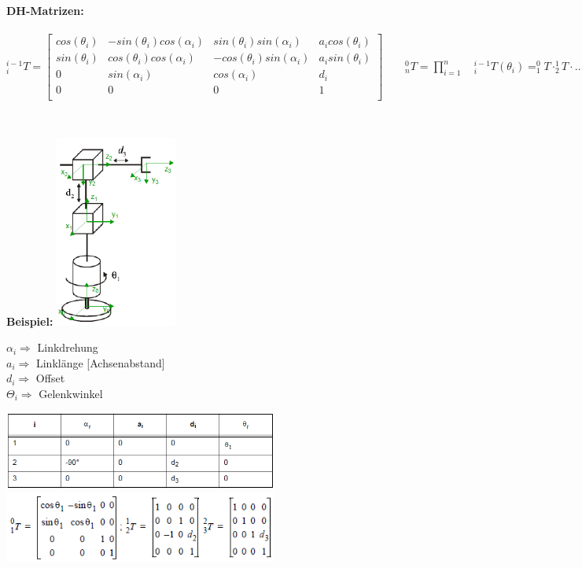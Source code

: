 \begin{minipage}{19cm}
    \textbf{DH-Matrizen:}\\ \\
    $ ^{i-1}_{i}T =
    \begin{bmatrix}
    cos(\theta_i) & -sin(\theta_i) cos(\alpha_i) &  sin(\theta_i) sin(\alpha_i) & a_i cos(\theta_i)\\
    sin(\theta_i) &  cos(\theta_i) cos(\alpha_i) & -cos(\theta_i) sin(\alpha_i) & a_i sin(\theta_i)\\
    0			  &  sin(\alpha_i)				 &  cos(\alpha_i)				& d_i\\
    0			  &  0							 &  0							& 1\\
    \end{bmatrix}
    \qquad
    ^{0}_{n}T = \prod\limits_{i=1}^{n} \quad ^{i-1}_{i}T(\theta_{i}) = ^{0}_{1}T \cdot ^{1}_{2}T \cdot \ldots \cdot ^{n-1}_{n}T $
\end{minipage}\\

\begin{minipage}{3cm}
    \textbf{Beispiel:}
    \includegraphics[width=4cm]{./bilder/denavit_grafik.png} \\
\end{minipage}
\begin{minipage}{6cm}
    $\alpha_{i} \Longrightarrow $ Linkdrehung  \\
    $ a_{i} \Longrightarrow $ Linklänge [Achsenabstand] \\
    $ d_{i} \Longrightarrow $ Offset \\
    $ \Theta_{i} \Longrightarrow $ Gelenkwinkel \\ 
\end{minipage}
\begin{minipage}{8cm}
    \includegraphics[width=9cm]{./bilder/denavit_tabelle.png} \\
    \includegraphics[width=9cm]{./bilder/denavit_matrix.png} \\
\end{minipage} \\
